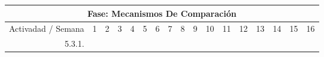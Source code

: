 \documentclass[12pt]{article}
\begin{document}
\begin{table}[H]
{\begin{tabular}{|rllllllllllllllll|}
			\multicolumn{17}{|c|}{\cellcolor[HTML]{D9D9D9}Fase: Mecanismos De Comparación}                                                                                                                                                                                                                                                                                                                                                                                                                                                                                                                                                                                                                                                                                                                                                                                                            \\ \hline
			\multicolumn{1}{|l|}{\cellcolor[HTML]{D9D9D9}Activadad / Semana}   & \multicolumn{1}{c|}{\cellcolor[HTML]{B6D7A8}1} & \multicolumn{1}{c|}{\cellcolor[HTML]{B6D7A8}2} & \multicolumn{1}{c|}{\cellcolor[HTML]{B6D7A8}3} & \multicolumn{1}{c|}{\cellcolor[HTML]{B6D7A8}4} & \multicolumn{1}{c|}{\cellcolor[HTML]{A4C2F4}5} & \multicolumn{1}{c|}{\cellcolor[HTML]{A4C2F4}6} & \multicolumn{1}{c|}{\cellcolor[HTML]{A4C2F4}7} & \multicolumn{1}{c|}{\cellcolor[HTML]{A4C2F4}8} & \multicolumn{1}{c|}{\cellcolor[HTML]{B4A7D6}9} & \multicolumn{1}{c|}{\cellcolor[HTML]{B4A7D6}10} & \multicolumn{1}{c|}{\cellcolor[HTML]{B4A7D6}11} & \multicolumn{1}{c|}{\cellcolor[HTML]{B4A7D6}12} & \multicolumn{1}{c|}{\cellcolor[HTML]{EA9999}13} & \multicolumn{1}{c|}{\cellcolor[HTML]{EA9999}14} & \multicolumn{1}{c|}{\cellcolor[HTML]{EA9999}15} & \multicolumn{1}{c|}{\cellcolor[HTML]{EA9999}16} \\ \hline
			\multicolumn{1}{|r|}{5.3.1.}                                       & \multicolumn{1}{l|}{}                          & \multicolumn{1}{l|}{}                          & \multicolumn{1}{l|}{}                          & \multicolumn{1}{l|}{}                          & \multicolumn{1}{l|}{}                          & \multicolumn{1}{l|}{}                          & \multicolumn{1}{c|}{\cellcolor[HTML]{A4C2F4}}  & \multicolumn{1}{l|}{}                          & \multicolumn{1}{l|}{}                          & \multicolumn{1}{l|}{}                           & \multicolumn{1}{l|}{}                           & \multicolumn{1}{l|}{}                           & \multicolumn{1}{l|}{}                           & \multicolumn{1}{l|}{}                           & \multicolumn{1}{l|}{}                           &                                                 \\ \hline

\end{tabular}}
\end{table}
\end{document}
